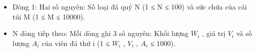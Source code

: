 \begin{itemize}
	\item     Dòng 1: Hai số nguyên: Số loại đá quý N (1 ≤ N ≤ 100) và sức chứa của cái túi M (1 ≤ M ≤ 10000).   
	\item     N dòng tiếp theo: Mỗi dòng ghi 3 số nguyên: Khối lượng $W_{i}$    , giá trị $V_{i}$    và số lượng $A_{i}$    của viên đá thứ i (1 ≤ $W_{i}$    , $V_{i}$    , $A_{i}$    ≤ 1000).   
\end{itemize}